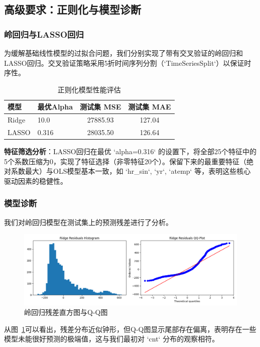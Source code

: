 \documentclass[UTF8,a4paper,10pt]{ctexart}
\begin{document}
\subsection{高级要求：正则化与模型诊断}
\subsubsection{岭回归与LASSO回归}
为缓解基础线性模型的过拟合问题，我们分别实现了带有交叉验证的岭回归和LASSO回归。交叉验证策略采用5折时间序列分割（`TimeSeriesSplit`）以保证时序性。

\begin{table}[H]
    \centering
    \caption{正则化模型性能评估}
    \begin{tabular}{llcc}
        \toprule
        \textbf{模型} & \textbf{最优Alpha} & \textbf{测试集 MSE} & \textbf{测试集 MAE} \\
        \midrule
        Ridge & 10.0 & 27885.93 & 127.04 \\
        LASSO & 0.316 & 28035.50 & 126.64 \\
        \bottomrule
    \end{tabular}
\end{table}

\textbf{特征筛选分析}：LASSO回归在最优 `alpha=0.316` 的设置下，将全部25个特征中的5个系数压缩为0，实现了特征选择（非零特征20个）。保留下来的最重要特征（绝对系数最大）与OLS模型基本一致，如 `hr_sin`, `yr`, `atemp` 等，表明这些核心驱动因素的稳健性。

\subsubsection{模型诊断}
我们对岭回归模型在测试集上的预测残差进行了分析。
\begin{figure}[H]
    \centering
    \includegraphics[width=\linewidth]{pic/Ridge.png}
    \caption{岭回归残差直方图与Q-Q图}
    \label{fig:residuals}
\end{figure}
从图~\ref{fig:residuals}可以看出，残差分布近似钟形，但Q-Q图显示尾部存在偏离，表明存在一些模型未能很好预测的极端值，这与我们最初对 `cnt` 分布的观察相符。
\end{document}
